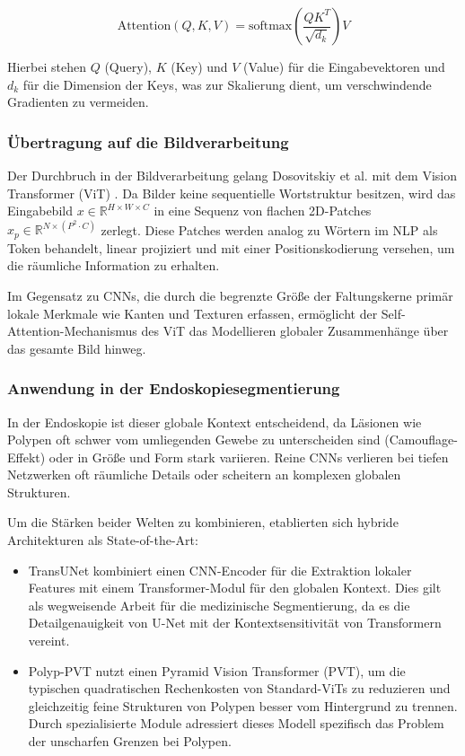 \begin{equation}
    \text{Attention}(Q,K,V) = \text{softmax}\left(\frac{QK^T}{\sqrt{d_k}}\right)V
\end{equation}

Hierbei stehen $Q$ (Query), $K$ (Key) und $V$ (Value) für die Eingabevektoren und $d_k$ für die Dimension der Keys, was zur Skalierung dient, um verschwindende Gradienten zu vermeiden.

\subsubsection{Übertragung auf die Bildverarbeitung}
Der Durchbruch in der Bildverarbeitung gelang Dosovitskiy et al. mit dem Vision Transformer (ViT) \cite{dosovitskiy2020image}. Da Bilder keine sequentielle Wortstruktur besitzen, wird das Eingabebild $x \in \mathbb{R}^{H \times W \times C}$ in eine Sequenz von flachen 2D-Patches $x_p \in \mathbb{R}^{N \times (P^2 \cdot C)}$ zerlegt. Diese Patches werden analog zu Wörtern im NLP als Token behandelt, linear projiziert und mit einer Positionskodierung versehen, um die räumliche Information zu erhalten.

Im Gegensatz zu CNNs, die durch die begrenzte Größe der Faltungskerne primär lokale Merkmale wie Kanten und Texturen erfassen, ermöglicht der Self-Attention-Mechanismus des ViT das Modellieren globaler Zusammenhänge über das gesamte Bild hinweg.

\subsubsection{Anwendung in der Endoskopiesegmentierung}
In der Endoskopie ist dieser globale Kontext entscheidend, da Läsionen wie Polypen oft schwer vom umliegenden Gewebe zu unterscheiden sind (Camouflage-Effekt) oder in Größe und Form stark variieren. Reine CNNs verlieren bei tiefen Netzwerken oft räumliche Details oder scheitern an komplexen globalen Strukturen.

Um die Stärken beider Welten zu kombinieren, etablierten sich hybride Architekturen als State-of-the-Art:
\begin{itemize}
    \item TransUNet \cite{chen2021transunet} kombiniert einen CNN-Encoder für die Extraktion lokaler Features mit einem Transformer-Modul für den globalen Kontext. Dies gilt als wegweisende Arbeit für die medizinische Segmentierung, da es die Detailgenauigkeit von U-Net mit der Kontextsensitivität von Transformern vereint.
    \item Polyp-PVT \cite{dong2021polyppvt} nutzt einen Pyramid Vision Transformer (PVT), um die typischen quadratischen Rechenkosten von Standard-ViTs zu reduzieren und gleichzeitig feine Strukturen von Polypen besser vom Hintergrund zu trennen. Durch spezialisierte Module adressiert dieses Modell spezifisch das Problem der unscharfen Grenzen bei Polypen.
\end{itemize}

